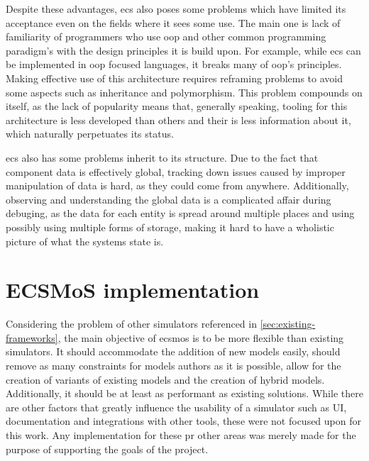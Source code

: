 \documentclass[twoside, 11pt]{article}
\begin{document}
Despite these advantages, \gls{ecs} also poses some problems which have limited its acceptance even on the fields where it sees some use. The main one is lack of familiarity of programmers who use \gls{oop} and other common programming paradigm's with the design principles it is build upon. For example, while \gls{ecs} can be implemented in \gls{oop} focused languages, it breaks many of \gls{oop}'s principles. Making effective use of this architecture requires reframing problems to avoid some aspects such as inheritance and polymorphism. This problem compounds on itself, as the lack of popularity means that, generally speaking, tooling for this architecture is less developed than others and their is less information about it, which naturally perpetuates its status.

\gls{ecs} also has some problems inherit to its structure. Due to the fact that component data is effectively global, tracking down issues caused by improper manipulation of data is hard, as they could come from anywhere. Additionally, observing and understanding the global data is a complicated affair during debuging, as the data for each entity is spread around multiple places and using possibly using multiple forms of storage, making it hard to have a wholistic picture of what the systems state is.



\section{ ECSMoS implementation} \label{sec:ecsmos-implementation}

Considering the problem of other simulators referenced in \autoref{sec:existing-frameworks}, the main objective of \gls{ecsmos} is to be more flexible than existing simulators. It should accommodate the addition of new models easily, should remove as many constraints for models authors as it is possible, allow for the creation of variants of existing models and the creation of hybrid models. Additionally, it should be at least as performant as existing solutions. While there are other factors that greatly influence the usability of a simulator such as UI, documentation and integrations with other tools, these were not focused upon for this work. Any implementation for these pr other areas was merely made for the purpose of supporting the goals of the project.
\end{document}
